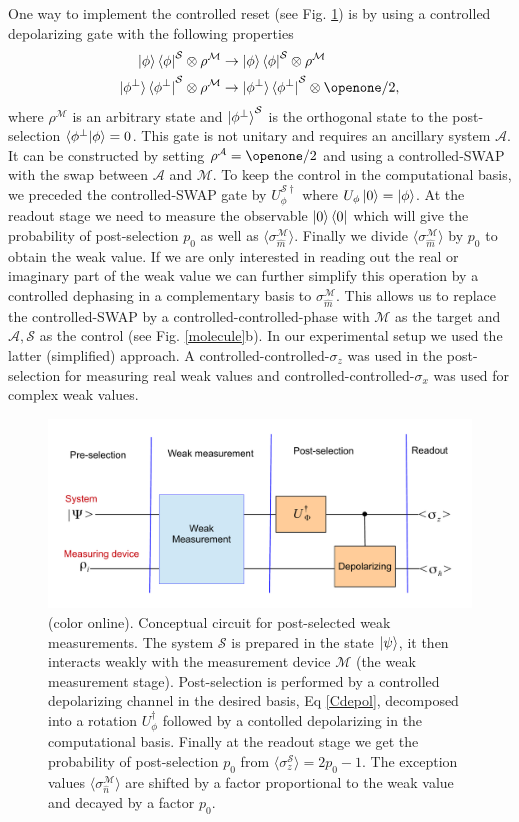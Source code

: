 \documentclass[aps,pra,12pt,onecolumn,showpacs,superscriptaddress,floatfix,footinbib,subfigure]{revtex4}
\def\bra#1{\mathinner{\langle{#1}|}}
\def\ket#1{\mathinner{|{#1}\rangle}}
\def\braket#1{\mathinner{\langle{#1}\rangle}}
\def\braket#1#2{\mathinner{\langle{#1}|{#2}\rangle}}
\def\es{{\mathcal{S}}}
\def\md{{\mathcal{M}}}
\def\ea{{\mathcal{A}}}
\def\sn{ \sigma_{ \hat{n} } }
\def\kb#1{\ket{#1}\bra{#1}}
\begin{document}
One way to implement the controlled reset  (see Fig. \ref{circuit})  is by using a controlled depolarizing gate with the following properties
\begin{align}\label{Cdepol}
\ket{\phi}\bra{\phi}^\es\otimes\rho^\md&\rightarrow \ket{\phi}\bra{\phi}^\es\otimes\rho^\md \nonumber\\
\kb{\phi^\perp}^\es\otimes\rho^\md &\rightarrow \kb{\phi^\perp}^\es\otimes\openone/2,
\end{align}
where  $\rho^\md$ is an arbitrary state and $\ket{\phi^\perp}^\es$ is the orthogonal state to the post-selection  $\braket{\phi^\perp}{\phi}=0$. This gate is not unitary and requires an ancillary system $\ea$. It can be  constructed  by setting $\rho^\ea=\openone/2$ and using a controlled-SWAP with the swap between $\ea$ and $\md$. To keep the control in the computational basis, we  preceded the controlled-SWAP gate by $U_\phi^{\es\dagger}$ where $U_\phi\ket{0}=\ket{\phi}$.  At the readout stage we  need to measure the observable $\kb{0}$ which will give the probability of post-selection $p_0$ as well as $\langle\sigma_{\hat{m}}^\md\rangle$. Finally we divide $\langle\sigma_{\hat{m}}^\md\rangle$  by $p_0$ to obtain the  weak value. If we are  only interested in reading out the real or imaginary part of the weak value we can further simplify this operation by a controlled dephasing in a complementary basis to $\sigma_{\hat{m}}^\md$. This allows us to replace the controlled-SWAP by a controlled-controlled-phase with $\md$ as the target and $\ea,\es$ as the control (see Fig. \ref{molecule}b). In our experimental setup  we  used the latter (simplified) approach.  A controlled-controlled-$\sigma_z$ was used in the post-selection for measuring real weak values and controlled-controlled-$\sigma_x$ was used for  complex weak values.

\begin{figure}[h] \centering
\includegraphics[width=\columnwidth]{Theory.pdf}
\caption{(color online). Conceptual circuit for  post-selected weak measurements. The system $\es$  is prepared in the state $\ket{\psi}$, it then interacts weakly with the measurement device $\md$ (the weak measurement stage). Post-selection is performed by a controlled depolarizing channel in the desired basis, Eq \eqref{Cdepol}, decomposed into a rotation $U^\dagger_\phi$ followed by a contolled depolarizing in the computational basis. Finally at the readout stage we get the probability of post-selection $p_0$ from   $\langle\sigma_z^\es\rangle=2p_0-1$. The exception values $\langle\sn^\md\rangle$  are  shifted by a factor proportional to the weak value and decayed by a factor $p_0$. }\label{circuit}
\end{figure}
\end{document}
